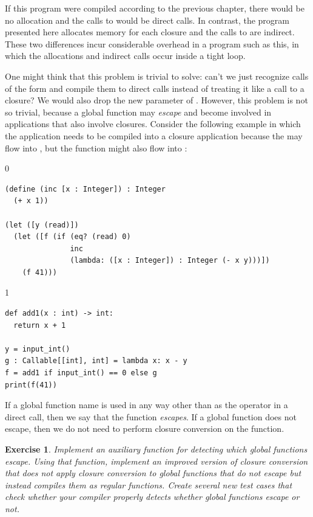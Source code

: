 \documentclass[7x10]{TimesAPriori_MIT}%
\def\racketEd{0}
\def\pythonEd{1}
\providecommand{\BookEdition}{1}
\let\edition\BookEdition
\newcommand{\pythonColor}[0]{}
\newtheorem{exercise}[theorem]{Exercise}
\numberwithin{theorem}{chapter}
\numberwithin{definition}{chapter}
\numberwithin{equation}{chapter}
\begin{document}
If this program were compiled according to the previous chapter, there
would be no allocation and the calls to  would be
direct calls. In contrast, the program presented here allocates memory
for each closure and the calls to  are indirect. These
two differences incur considerable overhead in a program such as this,
in which the allocations and indirect calls occur inside a tight loop.

One might think that this problem is trivial to solve: can't we just
recognize calls of the form 
and compile them to direct calls instead of treating it like a call to
a closure? We would also drop the new  parameter of
.
%
However, this problem is not so trivial, because a global function may
\emph{escape} and become involved in applications that also involve
closures. Consider the following example in which the application
 needs to be compiled into a closure
application because the  may flow into , but the
 function might also flow into :
\begin{center}
\begin{minipage}{\textwidth}
{\if\edition\racketEd  
\begin{lstlisting}
(define (inc [x : Integer]) : Integer
  (+ x 1))

(let ([y (read)])
  (let ([f (if (eq? (read) 0)
               inc
               (lambda: ([x : Integer]) : Integer (- x y)))])
    (f 41)))
\end{lstlisting}
\fi}
{\if\edition\pythonEd\pythonColor  
\begin{lstlisting}
def add1(x : int) -> int:
  return x + 1

y = input_int()
g : Callable[[int], int] = lambda x: x - y
f = add1 if input_int() == 0 else g
print(f(41))
\end{lstlisting}
\fi}
\end{minipage}
\end{center}
If a global function name is used in any way other than as the
operator in a direct call, then we say that the function
\emph{escapes}. If a global function does not escape, then we do not
need to perform closure conversion on the function.

\begin{exercise}\normalfont\normalsize
  Implement an auxiliary function for detecting which global
  functions escape. Using that function, implement an improved version
  of closure conversion that does not apply closure conversion to
  global functions that do not escape but instead compiles them as
  regular functions. Create several new test cases that check whether
  your compiler properly detects whether global functions escape or not.
\end{exercise}
\end{document}
